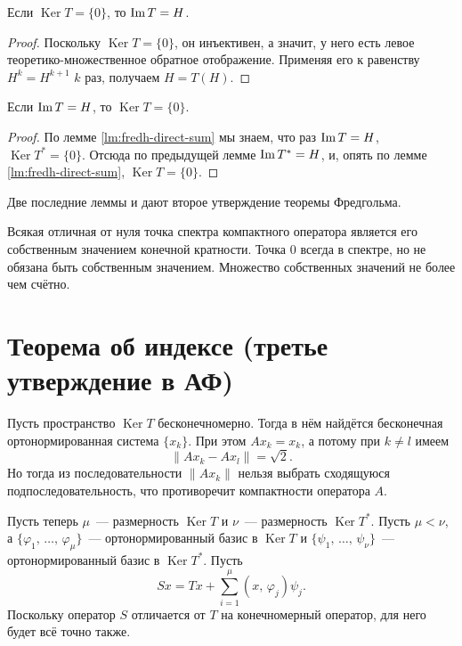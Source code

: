 \documentclass{notes}
\DeclareMathOperator{\Ker}{Ker}
\begin{document}
	\begin{lm}
		Если $\Ker T = \{0\}$, то $\operatorname{Im} T = H$.
		\begin{proof}
			Поскольку $\Ker T = \{0\}$, он инъективен, а значит, у него есть левое теоретико-множественное обратное отображение. Применяя его к равенству $H^k = H^{k + 1}$ $k$ раз, получаем $H = T(H)$.
		\end{proof}
	\end{lm}
 
	\begin{lm}
		Если $\operatorname{Im} T = H$, то $\Ker T = \{0\}$.
		\begin{proof}
			По лемме \ref{lm:fredh-direct-sum} мы знаем, что раз $\operatorname{Im} T = H$, $\Ker T^* = \{0\}$. Отсюда по предыдущей лемме $\operatorname{Im} T^* = H$, и, опять по лемме \ref{lm:fredh-direct-sum}, $\Ker T = \{0\}$.
		\end{proof}
	\end{lm}

	Две последние леммы и дают второе утверждение теоремы Фредгольма.

	\begin{cor}
		Всякая отличная от нуля точка спектра компактного оператора является его собственным значением конечной кратности. Точка $0$ всегда в спектре, но не обязана быть собственным значением. Множество собственных значений не более чем счётно.
	\end{cor}

\section{Теорема об индексе (третье утверждение в АФ)}

	Пусть пространство $\Ker T$ бесконечномерно. Тогда в нём найдётся бесконечная ортонормированная система $\{x_k\}$. При этом $Ax_k = x_k$, а потому при $k \neq l$ имеем
	\[
		\|Ax_k - Ax_l\| = \sqrt{2}.
	\]
	Но тогда из последовательности $\|Ax_k\|$ нельзя выбрать сходящуюся подпоследовательность, что противоречит компактности оператора $A$.

	Пусть теперь $\mu$~--- размерность $\Ker T$ и $\nu$~--- размерность $\Ker T^*$. Пусть $\mu < \nu$, а $\{\varphi_1, \, \ldots, \, \varphi_{\mu}\}$~--- ортонормированный базис в $\Ker T$ и $\{\psi_1, \, \ldots, \, \psi_{\nu}\}$~--- ортонормированный базис в $\Ker T^*$. Пусть
	\[
		Sx = Tx + \sum\limits_{i = 1}^{\mu} (x, \, \varphi_j) \psi_j.
	\]
	Поскольку оператор $S$ отличается от $T$ на конечномерный оператор, для него будет всё точно также. 
\end{document}
